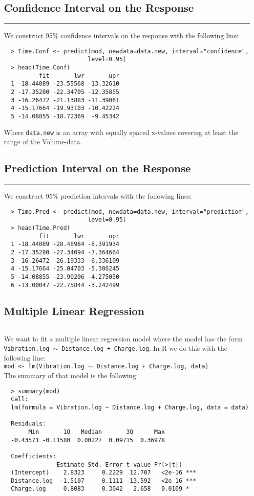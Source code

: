 \subsection{Confidence Interval on the Response}
\noindent\rule[\linienAbstand]{\linewidth}{\linienDicke}
We construct 95\% confidence intervals on the response with the following line:
\begingroup
\scriptsize
\begin{verbatim}
  > Time.Conf <- predict(mod, newdata=data.new, interval="confidence",
                        level=0.95)
  > head(Time.Conf)
          fit       lwr       upr
  1 -18.44089 -23.55568 -13.32610
  2 -17.35280 -22.34705 -12.35855
  3 -16.26472 -21.13883 -11.39061
  4 -15.17664 -19.93103 -10.42224
  5 -14.08855 -18.72369  -9.45342

\end{verbatim}
\endgroup
Where \texttt{data.new} is an array with equally spaced x-values covering at least the range of the Volume-data.\\

\subsection{Prediction Interval on the Response}
\noindent\rule[\linienAbstand]{\linewidth}{\linienDicke}
We construct 95\% prediction intervals with the following lines:
\begingroup
\scriptsize
\begin{verbatim}
  > Time.Pred <- predict(mod, newdata=data.new, interval="prediction",
                        level=0.95)
  > head(Time.Pred)
          fit       lwr       upr
  1 -18.44089 -28.48984 -8.391934
  2 -17.35280 -27.34094 -7.364664
  3 -16.26472 -26.19333 -6.336109
  4 -15.17664 -25.04703 -5.306245
  5 -14.08855 -23.90206 -4.275050
  6 -13.00047 -22.75844 -3.242499

\end{verbatim}
\endgroup

\subsection{Multiple Linear Regression}
\noindent\rule[\linienAbstand]{\linewidth}{\linienDicke}
We want to fit a multiple linear regression model where the model has the form \texttt{Vibration.log $\sim$ Distance.log + Charge.log}. In R we do this with the following line:\\
\texttt{mod <- lm(Vibration.log $\sim$ Distance.log + Charge.log, data)}\\
The summary of that model is the following:
\begingroup
\scriptsize
\begin{verbatim}
  > summary(mod)
  Call:
  lm(formula = Vibration.log ~ Distance.log + Charge.log, data = data)

  Residuals:
       Min       1Q   Median       3Q      Max
  -0.43571 -0.11580  0.00227  0.09715  0.36978

  Coefficients:
               Estimate Std. Error t value Pr(>|t|)
  (Intercept)    2.8323     0.2229  12.707   <2e-16 ***
  Distance.log  -1.5107     0.1111 -13.592   <2e-16 ***
  Charge.log     0.8083     0.3042   2.658   0.0109 *

\end{verbatim}
\endgroup

